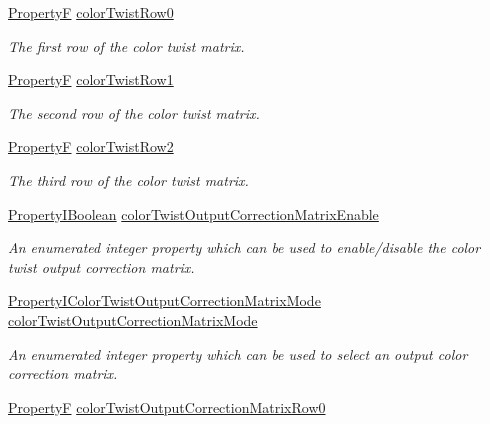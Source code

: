 \begin{DoxyCompactItemize}
\hyperlink{group___common_interface_gaf54865fe5a3d5cfd15f9a111b40d09f9}{Property\+F} \hyperlink{classmv_i_m_p_a_c_t_1_1acquire_1_1_image_processing_a45ac933511a34f20785f092d0758f6b1}{color\+Twist\+Row0}
\begin{DoxyCompactList}\small\item\em The first row of the color twist matrix. \end{DoxyCompactList}\item 
\hyperlink{group___common_interface_gaf54865fe5a3d5cfd15f9a111b40d09f9}{Property\+F} \hyperlink{classmv_i_m_p_a_c_t_1_1acquire_1_1_image_processing_a95f908912cfd2d3f82978070dacc8dac}{color\+Twist\+Row1}
\begin{DoxyCompactList}\small\item\em The second row of the color twist matrix. \end{DoxyCompactList}\item 
\hyperlink{group___common_interface_gaf54865fe5a3d5cfd15f9a111b40d09f9}{Property\+F} \hyperlink{classmv_i_m_p_a_c_t_1_1acquire_1_1_image_processing_a05e9180a634ee3c5da6e41e51a3db47f}{color\+Twist\+Row2}
\begin{DoxyCompactList}\small\item\em The third row of the color twist matrix. \end{DoxyCompactList}\item 
\hyperlink{group___common_interface_ga44f9437e24b21b6c93da9039ec6786aa}{Property\+I\+Boolean} \hyperlink{classmv_i_m_p_a_c_t_1_1acquire_1_1_image_processing_aa30358eeb33f8d1b26cbafc37e829c08}{color\+Twist\+Output\+Correction\+Matrix\+Enable}
\begin{DoxyCompactList}\small\item\em An enumerated integer property which can be used to enable/disable the color twist output correction matrix. \end{DoxyCompactList}\item 
\hyperlink{group___common_interface_gacf5323a7be006494492dd5f8c11c730e}{Property\+I\+Color\+Twist\+Output\+Correction\+Matrix\+Mode} \hyperlink{classmv_i_m_p_a_c_t_1_1acquire_1_1_image_processing_a9c592b9bee390d8f918b0ef837604fae}{color\+Twist\+Output\+Correction\+Matrix\+Mode}
\begin{DoxyCompactList}\small\item\em An enumerated integer property which can be used to select an output color correction matrix. \end{DoxyCompactList}\item 
\hyperlink{group___common_interface_gaf54865fe5a3d5cfd15f9a111b40d09f9}{Property\+F} \hyperlink{classmv_i_m_p_a_c_t_1_1acquire_1_1_image_processing_ab21f7d6e8ab3598c45411a1d66a3a71a}{color\+Twist\+Output\+Correction\+Matrix\+Row0}

\end{DoxyCompactItemize}
